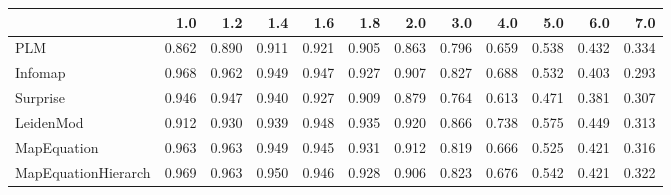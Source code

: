 \begin{tabular}{lrrrrrrrrrrr}
\toprule
{} &   1.0 &   1.2 &   1.4 &   1.6 &   1.8 &   2.0 &   3.0 &   4.0 &   5.0 &   6.0 &   7.0 \\
\midrule
PLM                 & 0.862 & 0.890 & 0.911 & 0.921 & 0.905 & 0.863 & 0.796 & 0.659 & 0.538 & 0.432 & 0.334 \\
Infomap             & 0.968 & 0.962 & 0.949 & 0.947 & 0.927 & 0.907 & 0.827 & 0.688 & 0.532 & 0.403 & 0.293 \\
Surprise            & 0.946 & 0.947 & 0.940 & 0.927 & 0.909 & 0.879 & 0.764 & 0.613 & 0.471 & 0.381 & 0.307 \\
LeidenMod           & 0.912 & 0.930 & 0.939 & 0.948 & 0.935 & 0.920 & 0.866 & 0.738 & 0.575 & 0.449 & 0.313 \\
MapEquation         & 0.963 & 0.963 & 0.949 & 0.945 & 0.931 & 0.912 & 0.819 & 0.666 & 0.525 & 0.421 & 0.316 \\
MapEquationHierarch & 0.969 & 0.963 & 0.950 & 0.946 & 0.928 & 0.906 & 0.823 & 0.676 & 0.542 & 0.421 & 0.322 \\
\bottomrule
\end{tabular}
